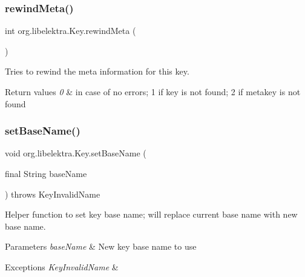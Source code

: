 \subsubsection{\texorpdfstring{rewind\+Meta()}{rewindMeta()}}
{\footnotesize\ttfamily int org.\+libelektra.\+Key.\+rewind\+Meta (\begin{DoxyParamCaption}{ }\end{DoxyParamCaption})\hspace{0.3cm}{\ttfamily [inline]}}



Tries to rewind the meta information for this key. 


\begin{DoxyRetVals}{Return values}
{\em 0} & in case of no errors; 1 if key is not found; 2 if metakey is not found \\
\hline
\end{DoxyRetVals}
\mbox{\label{classorg_1_1libelektra_1_1Key_a5226472bedc6a02dee826ee3facdb25f}} 
\subsubsection{\texorpdfstring{set\+Base\+Name()}{setBaseName()}}
{\footnotesize\ttfamily void org.\+libelektra.\+Key.\+set\+Base\+Name (\begin{DoxyParamCaption}\item[{final String}]{base\+Name }\end{DoxyParamCaption}) throws Key\+Invalid\+Name\hspace{0.3cm}{\ttfamily [inline]}}



Helper function to set key base name; will replace current base name with new base name. 


\begin{DoxyParams}{Parameters}
{\em base\+Name} & New key base name to use \\
\hline
\end{DoxyParams}

\begin{DoxyExceptions}{Exceptions}
{\em Key\+Invalid\+Name} & \\
\hline
\end{DoxyExceptions}
\mbox{\label{classorg_1_1libelektra_1_1Key_a005125c24abc41a799d73d09c8c148f1}} 
